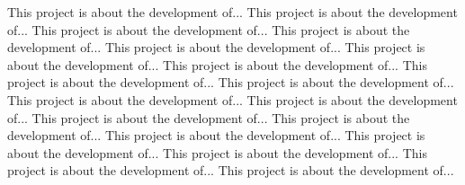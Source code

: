 This project is about the development of...
This project is about the development of...
This project is about the development of...
This project is about the development of...
This project is about the development of...
This project is about the development of...
This project is about the development of...
This project is about the development of...
This project is about the development of...
This project is about the development of...
This project is about the development of...
This project is about the development of...
This project is about the development of...
This project is about the development of...
This project is about the development of...
This project is about the development of...
This project is about the development of...
This project is about the development of...
